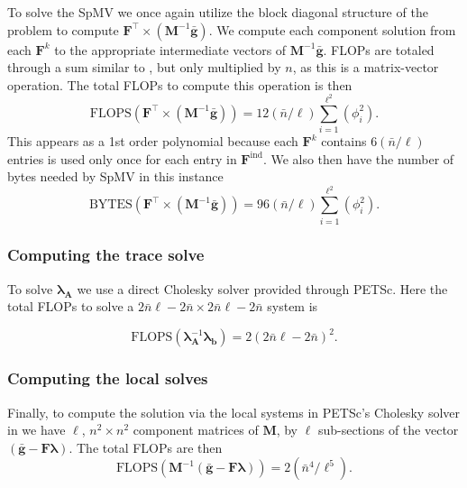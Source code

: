 %
%
%
To solve the SpMV we once again utilize the block diagonal structure of the problem to compute $\textbf{F}^\intercal \times (\textbf{M}^{-1}\bar{\textbf{g}})$. 
We compute each component solution from each $\textbf{F}^k$ to the appropriate intermediate vectors of $\textbf{M}^{-1}\bar{\textbf{g}}$.
FLOPs are totaled through a sum similar to , but only multiplied by $n$, as this is a matrix-vector operation.  
The total FLOPs to compute this operation is then 
\begin{equation}
	\text{FLOPS}(\textbf{F}^\intercal \times (\textbf{M}^{-1}\bar{\textbf{g}})) = 12(\bar{n}/\ell) \sum_{i=1}^{\ell^2} (\phi_i^2).
\end{equation}
This appears as a 1st order polynomial because each $\textbf{F}^k$ contains $6(\bar{n}/\ell)$ entries is used only once for each entry in $\textbf{F}^{\text{ind}}$.
We also then have the number of bytes needed by SpMV in this instance
\begin{equation}
	\text{BYTES}(\textbf{F}^\intercal \times (\textbf{M}^{-1}\bar{\textbf{g}})) = 96(\bar{n}/\ell) \sum_{i=1}^{\ell^2} (\phi_i^2).
\end{equation}

%
%
%
\subsubsection{Computing the trace solve}

%
%
%
To solve $\symbf{\lambda}_{\textbf{A}}$ we use a direct Cholesky solver provided through PETSc. 
Here the total FLOPs to solve a $2\bar{n}\ell - 2\bar{n} \times 2\bar{n}\ell - 2\bar{n}$ system is 

\begin{equation}
	\text{FLOPS}(\symbf{\lambda}_{\textbf{A}}^{-1}\symbf{\lambda}_{\textbf{b}}) = 2  (2\bar{n}\ell - 2\bar{n})^2.
\end{equation}

%
%
%
\subsubsection{Computing the local solves}

%
%
%
Finally, to compute the solution via the local systems in PETSc's Cholesky solver in  we have $\ell$, $n^2 \times n^2$ component matrices of $\textbf{M}$, by $\ell$ sub-sections of the vector $(\bar{\textbf{g}} - \textbf{F} \symbf{\lambda})$. 
The total FLOPs are then 
\begin{equation}
	\text{FLOPS}(\textbf{M}^{-1}(\bar{\textbf{g}} - \textbf{F} \symbf{\lambda})) = 2 (\bar{n}^4/\ell^5).
\end{equation}

